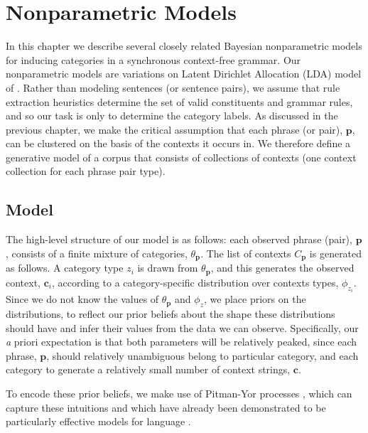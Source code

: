 
\newcommand{\p}{\textbf{p}}

\chapter{Nonparametric Models}

In this chapter we describe several closely related Bayesian nonparametric models for inducing categories in a synchronous context-free grammar.  Our nonparametric models are variations on Latent Dirichlet Allocation (LDA) model of \cite{blei:2003}.  Rather than modeling sentences (or sentence pairs), we assume that rule extraction heuristics determine the set of valid constituents and grammar rules, and so our task is only to determine the category labels.  As discussed in the previous chapter, we make the critical assumption that each phrase (or pair), $\p$, can be clustered on the basis of the contexts it occurs in.  We therefore define a generative model of a corpus that consists of collections of contexts (one context collection for each phrase pair type).

\section{Model}

The high-level structure of our model is as follows: each observed phrase (pair), $\p$, consists of a finite mixture of categories, $\theta_{\p}$.  The list of contexts $C_{\p}$ is generated as follows.  A category type $z_i$ is drawn from $\theta_{\p}$, and this generates the observed context, $\textbf{c}_i$, according to a category-specific distribution over contexts types, $\phi_{z_i}$.  Since we do not know the values of $\theta_{\p}$ and $\phi_z$, we place priors on the distributions, to reflect our prior beliefs about the shape these distributions should have and infer their values from the data we can observe.  Specifically, our {\emph a priori} expectation is that both parameters will be relatively peaked, since each phrase, $\p$, should relatively unambiguous belong to particular category, and each category to generate a relatively small number of context strings, $\textbf{c}$.

To encode these prior beliefs, we make use of Pitman-Yor processes \citep{pitman:1997}, which can capture these intuitions and which have already been demonstrated to be particularly effective models for language \citep{teh:2006,goldwater:2006}.

